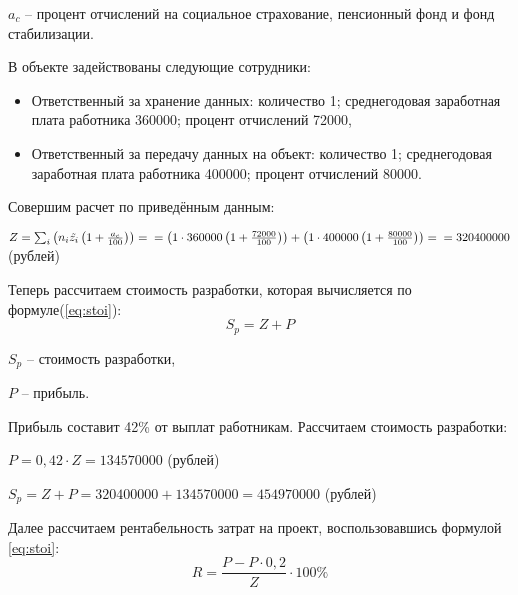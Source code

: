 $a_{c}$ -- процент отчислений на социальное страхование, пенсионный фонд и фонд стабилизации.

В объекте задействованы следующие сотрудники:
\begin{itemize}
    \item Ответственный за хранение данных: количество 1; среднегодовая заработная плата работника 360000; процент отчислений 72000,
    \item Ответственный за передачу данных на объект: количество 1; среднегодовая заработная плата работника 400000; процент отчислений 80000.
\end{itemize}
Совершим расчет по приведённым данным: 
\begin{flushleft}
\begin{math}
Z = \sum_{i}^{}{\left(n_{i}\tilde{z_{i}}\left(1+\frac{a_{c}}{100} \right) \right)} = \\ = \left( 1\cdot 360000 \left(1+\frac{72000}{100} \right)\right) + \left( 1\cdot 400000 \left(1+\frac{80000}{100} \right)\right) = \\ = 320400000
\end{math}(рублей)\end{flushleft} 

Теперь рассчитаем  стоимость разработки, которая вычисляется по формуле(\ref{eq:stoi}):
\begin{equation}\label{eq:stoi}
S_{p} = Z + P
\end{equation}

$S_{p}$ -- стоимость разработки,

$P$ -- прибыль.

Прибыль составит 42\% от выплат работникам. Рассчитаем стоимость разработки:
\begin{flushleft}
\begin{math}
P = 0,42 \cdot Z = 134570000\end{math} (рублей)\end{flushleft}
\begin{flushleft}
\begin{math}
S_{p} = Z + P = 320400000 + 134570000 = 454970000
\end{math} (рублей)\end{flushleft}

Далее рассчитаем рентабельность затрат на проект, воспользовавшись формулой \ref{eq:stoi}:
\begin{equation}\label{eq:stoi}
R=\frac{P-P \cdot 0,2}{Z} \cdot 100\%
\end{equation}

